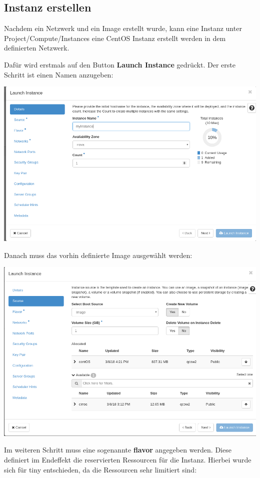\subsection{Instanz erstellen}
Nachdem ein Netzwerk und ein Image erstellt wurde, kann eine Instanz unter Project/Compute/Instances eine CentOS Instanz erstellt werden in dem definierten Netzwerk.

Dafür wird erstmals auf den Button \textbf{Launch Instance} gedrückt. Der erste Schritt ist einen Namen anzugeben:

\begin{minipage}{\linewidth}
	\centering
	\includegraphics[width=.8\linewidth]{images/instancename}
\end{minipage}

Danach muss das vorhin definierte Image ausgewählt werden:

\begin{minipage}{\linewidth}
	\centering
	\includegraphics[width=.7\linewidth]{images/instanceimage}
\end{minipage}

Im weiteren Schritt muss eine sogenannte \textbf{flavor} angegeben werden. Diese definiert im Endeffekt die reservierten Ressourcen für die Instanz. Hierbei wurde sich für tiny entschieden, da die Ressourcen sehr limitiert sind:

